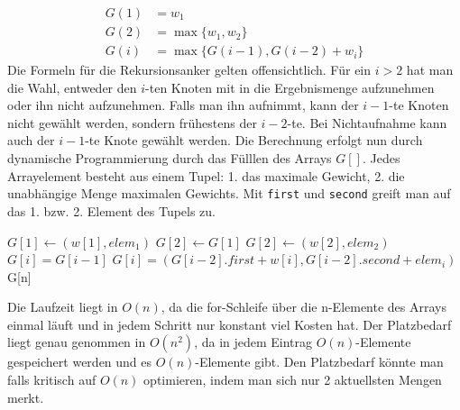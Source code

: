 \documentclass[a4paper,10pt]{scrartcl}
\begin{document}
\begin{enumerate}
  \begin{align*}
            G(1) &= w_1 \\
            G(2) &= \max\{w_1,w_2\} \\
            G(i) &= \max\{G(i-1), G(i-2) + w_i\} 
   \end{align*}
  Die Formeln für die Rekursionsanker gelten offensichtlich. Für ein $i > 2$ hat man die Wahl, entweder den $i$-ten Knoten mit in die Ergebnismenge aufzunehmen oder ihn nicht aufzunehmen.
  Falls man ihn aufnimmt, kann der $i-1$-te Knoten nicht gewählt werden, sondern frühestens der $i - 2$-te. Bei Nichtaufnahme kann auch der $i-1$-te Knote gewählt werden.
  Die Berechnung erfolgt nun durch dynamische Programmierung durch das Fülllen des Arrays $G[]$. Jedes Arrayelement besteht aus einem Tupel: 1. das maximale Gewicht, 2. die unabhängige Menge maximalen Gewichts.
  Mit \verb!first! und \verb!second! greift man auf das 1. bzw. 2. Element des Tupels zu.
\begin{algorithmic}
      \STATE $G[1] \gets (w[1], elem_1)$
	\STATE $G[2] \gets G[1]$
      \ELSE
	\STATE $G[2] \gets (w[2], elem_2)$
      \ENDIF
	  \STATE $G[i] = G[i - 1]$
	\ELSE
	  \STATE $G[i] = (G[i - 2].first + w[i], G[i - 2].second + elem_i)$
	\ENDIF
    \ENDFOR
    \RETURN G[n]
  \end{algorithmic}
Die Laufzeit liegt in $O(n)$, da die for-Schleife über die n-Elemente des Arrays einmal läuft und in jedem Schritt nur konstant viel Kosten hat. Der Platzbedarf liegt genau genommen in $O(n^2)$,
da in jedem Eintrag $O(n)$-Elemente gespeichert werden und es $O(n)$-Elemente gibt. Den Platzbedarf könnte man falls kritisch auf $O(n)$ optimieren, indem man sich nur 2 aktuellsten Mengen merkt.
\end{enumerate}
\end{document}
